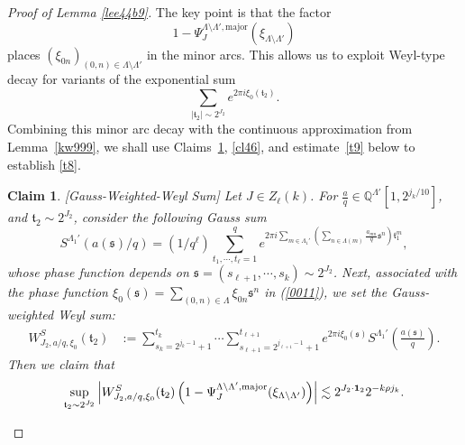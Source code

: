 \documentclass[11 pt,letterpaper]{amsart}
\theoremstyle{plain}
\newtheorem{claim}{Claim}\numberwithin{claim}{section}
\theoremstyle{definition}
\theoremstyle{remark} \theoremstyle{exam} \theoremstyle{ob}
\numberwithin{equation}{section}
\begin{document}
\begin{proof}[Proof of Lemma \ref{lee44b9}]
The key point is that the factor
\[
1-\Psi_J^{\Lambda\setminus \Lambda',\mathrm{major}}(\xi_{\Lambda\setminus\Lambda'})
\]
places $(\xi_{0n})_{(0,n)\in \Lambda\setminus\Lambda'}$ in the minor arcs. This allows us to exploit Weyl-type decay for variants of the exponential sum
\[
\sum_{|\mathfrak{t}_2|\sim 2^{J_2}} e^{2\pi i \xi_0(\mathfrak{t}_2)}.
\]
Combining this minor arc decay with the continuous approximation from Lemma~\ref{kw999}, we shall use Claims~\ref{ap90}, \ref{cl46}, and estimate~\eqref{t9} below to establish \eqref{t8}.

\begin{claim}\label{ap90} [Gauss-Weighted-Weyl Sum] 
Let  $J\in Z_{\ell}(k)$. For    $\frac{a}{q} \in  \mathbb{Q}^{\Lambda'}[1,2^{j_k/10}]$, and $\mathfrak{t}_2\sim 2^{J_2}$,  consider the following Gauss sum
$$ S^{\Lambda_1'}(a(\mathfrak{s})/q)=(1/q^{\ell})\sum_{t_1,\cdots,t_{\ell}=1}^q e^{2\pi i \sum_{m\in \Lambda_1'}\left(\sum_{n\in \Lambda(m)} \frac{a_{mn}}{q}\mathfrak{s}^n\right)\mathfrak{t}_1^{m}},$$  whose phase function depends on $\mathfrak{s}=(s_{\ell+1},\cdots,s_k)\sim 2^{J_2}$. Next, associated with the phase function  $ \xi_0(\mathfrak{s})=\sum_{(0,n)\in \Lambda} \xi_{0n}\mathfrak{s}^{n} $  in (\ref{0011}), we set the Gauss-weighted Weyl sum:
\begin{align}\label{kanj}
 W^S_{J_2,a/q,\xi_0}(\mathfrak{t}_2)& :=\sum_{s_k=2^{j_k-1}+1}^{t_k} \cdots \sum_{s_{\ell+1}=2^{j_{\ell+1}-1}+1}^{t_{\ell+1}} e^{2\pi i \xi_0(\mathfrak{s})}S^{\Lambda_{1}'}\left(\frac{a(\mathfrak{s})}{q}\right).
\end{align}
  Then we  claim that 
\begin{align}\label{sstt19}
\sup_{ \mathfrak{t}_2 \sim 2^{J_2}}\left| W^S_{J_2,a/q,\xi_0}(\mathfrak{t}_2)\left(1-\Psi_J^{\Lambda\setminus \Lambda',\rm{major}}(\xi_{\Lambda\setminus\Lambda'})\right)\right|\lesssim 2^{J_2\cdot {\bf 1}_2}2^{-k\rho j_{k}}.
\end{align}
\end{claim}


\end{proof}
\end{document}
